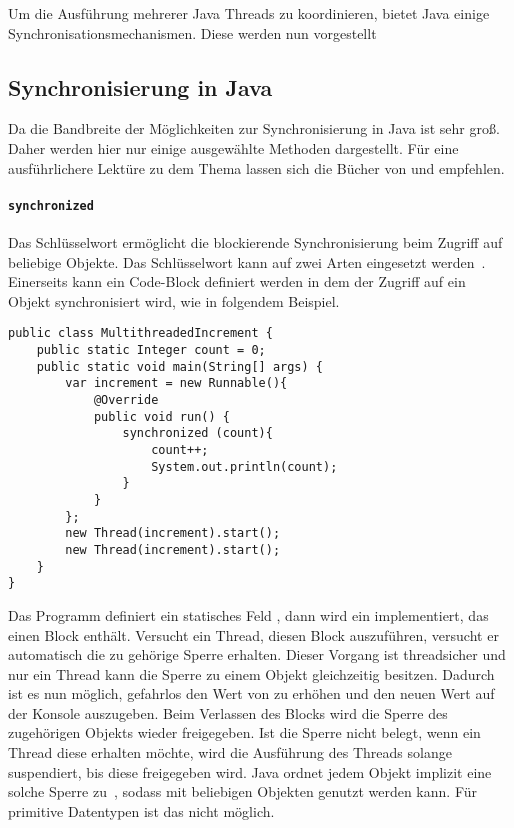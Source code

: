 Um die Ausführung mehrerer Java Threads zu koordinieren, bietet Java einige Synchronisationsmechanismen. Diese werden nun vorgestellt

\subsection{Synchronisierung in Java}
Da die Bandbreite der Möglichkeiten zur Synchronisierung in Java ist sehr groß. Daher werden hier nur einige ausgewählte Methoden dargestellt. Für eine ausführlichere Lektüre zu dem Thema lassen sich die Bücher von \textcite{Friesen2015} und \textcite{Hettel2016} empfehlen.

\paragraph{\texttt{synchronized}} Das Schlüsselwort  ermöglicht die blockierende Synchronisierung beim Zugriff auf beliebige Objekte. Das Schlüsselwort kann auf zwei Arten eingesetzt werden~\Cite[S.~339~ff.]{Rauber2006}. Einerseits kann ein Code-Block definiert werden in dem der Zugriff auf ein Objekt synchronisiert wird, wie in folgendem Beispiel.
\begin{lstlisting}
public class MultithreadedIncrement {
	public static Integer count = 0;
	public static void main(String[] args) {
		var increment = new Runnable(){
			@Override
			public void run() {
				synchronized (count){
					count++;
					System.out.println(count);
				}
			}
		};
		new Thread(increment).start();
		new Thread(increment).start();
	}
}	
\end{lstlisting}
Das Programm definiert ein statisches Feld , dann wird ein  implementiert, das einen  Block enthält. Versucht ein Thread, diesen Block auszuführen, versucht er automatisch die zu  gehörige Sperre erhalten. Dieser Vorgang ist threadsicher und nur ein Thread kann die Sperre zu einem Objekt gleichzeitig besitzen. Dadurch ist es nun möglich, gefahrlos den Wert von  zu erhöhen und den neuen Wert auf der Konsole auszugeben. Beim Verlassen des  Blocks wird die Sperre des zugehörigen Objekts wieder freigegeben. Ist die Sperre nicht belegt, wenn ein Thread diese erhalten möchte, wird die Ausführung des Threads solange suspendiert, bis diese freigegeben wird. Java ordnet jedem Objekt implizit eine solche Sperre zu~\cite{Friesen2015}, sodass  mit beliebigen Objekten genutzt werden kann. Für primitive Datentypen ist das nicht möglich.

